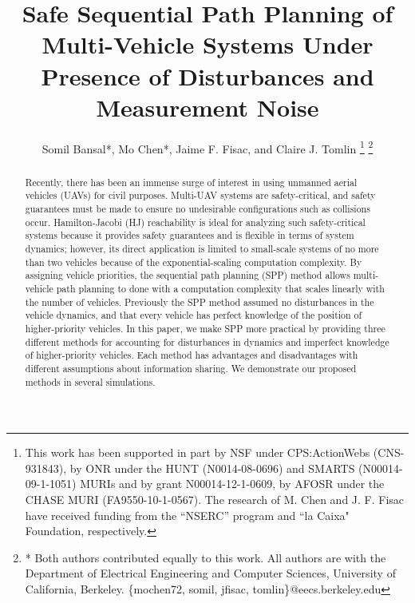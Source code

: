 \documentclass[letterpaper, 10pt, conference]{ieeeconf}      %
\title{\LARGE \bf
Safe Sequential Path Planning of Multi-Vehicle Systems Under Presence of Disturbances and Measurement Noise}
\author{Somil Bansal*, Mo Chen*, Jaime F. Fisac, and Claire J. Tomlin
\thanks{This work has been supported in part by NSF under CPS:ActionWebs (CNS-931843), by ONR under the HUNT (N0014-08-0696) and SMARTS (N00014-09-1-1051) MURIs and by grant N00014-12-1-0609, by AFOSR under the CHASE MURI (FA9550-10-1-0567). The research of M. Chen and J. F. Fisac have received funding from the ``NSERC'' program and ``la Caixa" Foundation, respectively.}
\thanks{* Both authors contributed equally to this work. All authors are with the Department of Electrical Engineering and Computer Sciences, University of California, Berkeley. \{mochen72, somil, jfisac, tomlin\}@eecs.berkeley.edu}
}
\begin{document}
\maketitle
\thispagestyle{empty}
\pagestyle{empty}

\begin{abstract}
Recently, there has been an immense surge of interest in using unmanned aerial vehicles (UAVs) for civil purposes. Multi-UAV systems are safety-critical, and safety guarantees must be made to ensure no undesirable configurations such as collisions occur. Hamilton-Jacobi (HJ) reachability is ideal for analyzing such safety-critical systems because it provides safety guarantees and is flexible in terms of system dynamics; however, its direct application is limited to small-scale systems of no more than two vehicles because of the exponential-scaling computation complexity. By assigning vehicle priorities, the sequential path planning (SPP) method allows multi-vehicle path planning to done with a computation complexity that scales linearly with the number of vehicles. Previously the SPP method assumed no disturbances in the vehicle dynamics, and that every vehicle has perfect knowledge of the position of higher-priority vehicles. In this paper, we make SPP more practical by providing three different methods for accounting for disturbances in dynamics and imperfect knowledge of higher-priority vehicles. Each method has advantages and disadvantages with different assumptions about information sharing. We demonstrate our proposed methods in several simulations.
\end{abstract}









\end{document}
